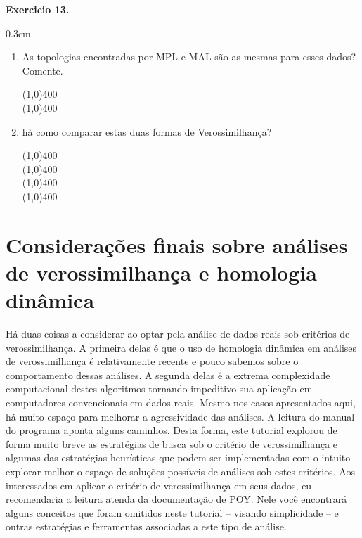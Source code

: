 \begin{refsection}
\begin{blackBlock}{\textbf{Exercicio 13.}}
\end{blackBlock}


\begin {myindentpar}{0.3cm}
\begin{enumerate}[\itshape i.]

	\item{As topologias encontradas por MPL e MAL são as mesmas para esses dados? Comente.}

\begin{center}
\line(1,0){400}\\
\line(1,0){400}\\
\end{center}


	\item{hà como comparar estas duas formas de Verossimilhança?}

\begin{center}
\line(1,0){400}\\
\line(1,0){400}\\
\line(1,0){400}\\
\line(1,0){400}\\

\end{center}

\end{enumerate}
\end{myindentpar}

\section{Considerações finais sobre análises de verossimilhança e homologia dinâmica}\label{tut13:mldo}

Há duas coisas a considerar ao optar pela análise de dados reais sob critérios de verossimilhança. A primeira delas é que o uso de homologia dinâmica em análises de verossimilhança é relativamente recente e pouco sabemos sobre o comportamento dessas análises. A segunda delas é a extrema complexidade computacional destes algoritmos tornando impeditivo sua aplicação em computadores convencionais em dados reais. Mesmo nos casos apresentados aqui, há muito espaço para melhorar a agressividade das análises. A leitura do manual do programa aponta alguns caminhos. Desta forma, este tutorial explorou de forma muito breve as estratégias de busca sob o critério de verossimilhança e algumas das estratégias heurísticas que podem ser implementadas com o intuito explorar melhor o espaço de soluções possíveis de análises sob estes critérios. Aos interessados em aplicar o critério de verossimilhança em seus dados, eu recomendaria a leitura atenda da documentação de POY. Nele você encontrará alguns conceitos que foram omitidos neste tutorial -- visando simplicidade -- e outras estratégias e ferramentas associadas a este tipo de análise.\\


\end{refsection}
